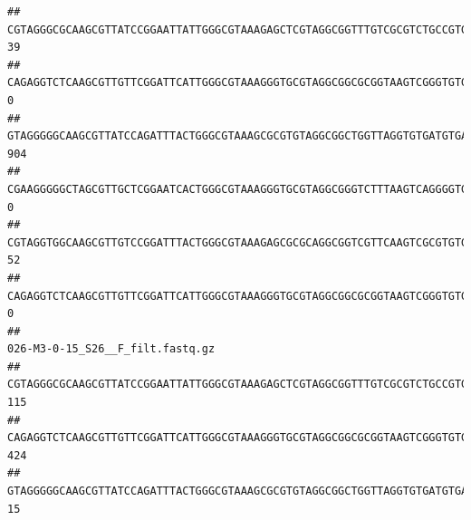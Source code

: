 \documentclass[]{article}
\begin{document}
\begin{verbatim}
## CGTAGGGCGCAAGCGTTATCCGGAATTATTGGGCGTAAAGAGCTCGTAGGCGGTTTGTCGCGTCTGCCGTGAAAGTCCGGGGCTCAACTCCGGATCTGCGGTGGGTACGGGCAGACTAGAGTGATGTAGGGGAGACTGGAATTCCTGGTGTAGCGGTGAAATGCGCAGATATCAGGAGGAACACCGATGGCGAAGGCAGGTCTCTGGGCATTAACTGACGCTGAGGAGCGAAAGCATGGGGAGCGAACA                                39
## CAGAGGTCTCAAGCGTTGTTCGGATTCATTGGGCGTAAAGGGTGCGTAGGCGGCGCGGTAAGTCGGGTGTGAAATCTCGGAGCTTAACTCCGAAACTGCATTCGATACTGCCGTGCTTGAGGACTGGAGAGGAGACTGGAATTTACGGTGTAGCGGTGAAATGCGTAGATATCGTAAGGAAGACCAGTGGCGAAGGCGGGTCTCTGGACAGTTCCTGACGCTGAGGCACGAAGGCCAGGGGAGCAAACG                                 0
## GTAGGGGGCAAGCGTTATCCAGATTTACTGGGCGTAAAGCGCGTGTAGGCGGCTGGTTAGGTGTGATGTGAAATCTTCCGGCTCAACCGGAAAACTGCATTGCAAACCGGCCTGGCTAGAGTGCAGGAGAGGGAAGCGGAATTCCAGGTGTAGCGGTGAAATGCGTAGATATCTGGAGGAACACCAGTGGCGAAGGCGGCTTCCTGGCCTGCAACTGACGCTGAGACGCGAAAGCGTGGGGAGCGAAC                                904
## CGAAGGGGGCTAGCGTTGCTCGGAATCACTGGGCGTAAAGGGTGCGTAGGCGGGTCTTTAAGTCAGGGGTGAAATCCTGGAGCTCAACTCCAGAACTGCCTTTGATACTGAAGATCTTGAGTTCGGGAGAGGTGAGTGGAACTGCGAGTGTAGAGGTGAAATTCGTAGATATTCGCAAGAACACCAGTGGCGAAGGCGGCTCACTGGCCCGATACTGACGCTGAGGCACGAAAGCGTGGGGAGCAAACA                                 0
## CGTAGGTGGCAAGCGTTGTCCGGATTTACTGGGCGTAAAGAGCGCGCAGGCGGTCGTTCAAGTCGCGTGTGAAAGCCCCCGGCTCAACTGGGGAGGGTCACGCGATACTGATCGACTCGAAGGCAGGAGAGGGTAGTGGAATTCCCGGTGTAGTGGTGAAATGCGTAGATATCGGGAGGAACACCAGTGGCGAAGGCGACTACCTGGCCTGTTCTTGACGCTGAGGCGCGAAAGCTAGGGGAGCAAACG                                52
## CAGAGGTCTCAAGCGTTGTTCGGATTCATTGGGCGTAAAGGGTGCGTAGGCGGCGCGGTAAGTCGGGTGTGAAATCTCGGGGCTTAACTCCGAAACTGCATTCGATACTGCCGTGCTTGAGGACTGGAGAGGAGACTGGAATTTACGGTGTAGCGGTGAAATGCGTAGATATCGTAAGGAAGACCAGTGGCGAAGGCGGGTCTCTGGACAGTTCCTGACGCTGAGGCACGAAGGCCAGGGGAGCAAACG                                 0
##                                                                                                                                                                                                                                                           026-M3-0-15_S26__F_filt.fastq.gz
## CGTAGGGCGCAAGCGTTATCCGGAATTATTGGGCGTAAAGAGCTCGTAGGCGGTTTGTCGCGTCTGCCGTGAAAGTCCGGGGCTCAACTCCGGATCTGCGGTGGGTACGGGCAGACTAGAGTGATGTAGGGGAGACTGGAATTCCTGGTGTAGCGGTGAAATGCGCAGATATCAGGAGGAACACCGATGGCGAAGGCAGGTCTCTGGGCATTAACTGACGCTGAGGAGCGAAAGCATGGGGAGCGAACA                              115
## CAGAGGTCTCAAGCGTTGTTCGGATTCATTGGGCGTAAAGGGTGCGTAGGCGGCGCGGTAAGTCGGGTGTGAAATCTCGGAGCTTAACTCCGAAACTGCATTCGATACTGCCGTGCTTGAGGACTGGAGAGGAGACTGGAATTTACGGTGTAGCGGTGAAATGCGTAGATATCGTAAGGAAGACCAGTGGCGAAGGCGGGTCTCTGGACAGTTCCTGACGCTGAGGCACGAAGGCCAGGGGAGCAAACG                              424
## GTAGGGGGCAAGCGTTATCCAGATTTACTGGGCGTAAAGCGCGTGTAGGCGGCTGGTTAGGTGTGATGTGAAATCTTCCGGCTCAACCGGAAAACTGCATTGCAAACCGGCCTGGCTAGAGTGCAGGAGAGGGAAGCGGAATTCCAGGTGTAGCGGTGAAATGCGTAGATATCTGGAGGAACACCAGTGGCGAAGGCGGCTTCCTGGCCTGCAACTGACGCTGAGACGCGAAAGCGTGGGGAGCGAAC                                15

\end{verbatim}
\end{document}
